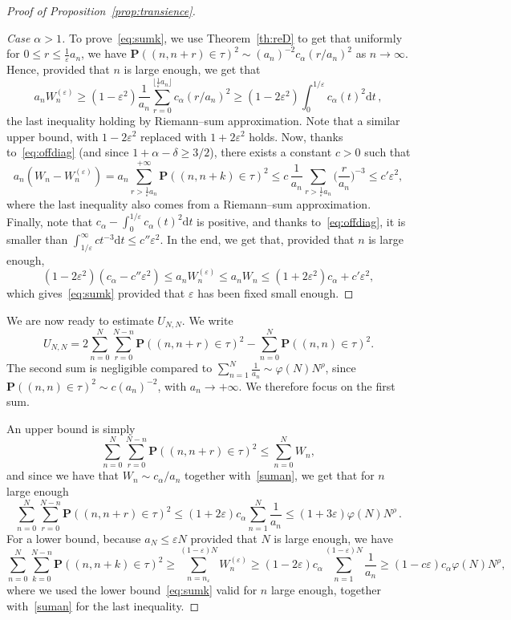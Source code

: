 \documentclass[10pt]{amsart}
\theoremstyle{definition}\newtheorem{defi}[theo]{Definition}\newtheorem{rema}[theo]{Remark}\newtheorem{exam}[theo]{Example}\newtheorem{exem}[theo]{Example}\newtheorem{nota}[theo]{Notation}
\newenvironment{step}[1]{\begin{proof}[{#1}]}{\let\qed\relax\end{proof}}
\newcommand{\ga}{\alpha}
\newcommand{\gd}{\delta}
\newcommand{\gep}{\varepsilon}
\newcommand{\dd}{\mathrm{d}}
\newcommand{\bP}{\ensuremath{\mathbf{P}}}
\newenvironment{proofc}[1][\proofname]{\begin{proof}[{#1}]}{\end{proof}}
\begin{document}
\begin{appendix}
\begin{proofc}[Proof of Proposition~\ref{prop:transience}]
\begin{step}{Case $\ga > 1$}
To prove~\eqref{eq:sumk}, we use Theorem~\ref{th:reD} to get that uniformly for $0\leq r\leq \tfrac 1\gep a_n$, we have $\bP((n,n+r) \in \tau)^2 \sim (a_n)^{-2} c_{\ga}(r/a_n)^2$ as $n\to\infty$. Hence, provided that $n$ is large enough, we get that
\[
a_n W_n^{(\gep)} \geq (1-\gep^2) \frac{1}{a_n} \sum_{r=0}^{\lfloor\frac1\gep a_n \rfloor} c_{\ga}(r/a_n)^2 \geq (1-2\gep^2) \int_{0}^{1/\gep} c_{\ga}(t)^2 \dd t\,,
\]
the last inequality holding by Riemann--sum approximation. Note that a similar upper bound, with $1-2\gep^2$ replaced with $1+2\gep^2$ holds. Now, thanks to~\eqref{eq:offdiag} (and since $1+\ga-\gd \geq 3/2$), there exists a constant $c>0$ such that
\[
a_n(W_n-W_n^{(\gep)}) = a_n \sum_{r > \frac1\gep a_n}^{+\infty} \bP((n,n+k) \in \tau)^2 \leq c\,\frac{1}{a_n} \sum_{r>\frac1\gep a_n} \Big(\frac{r}{a_n} \Big)^{-3} \leq c' \gep^2,
\]
where the last inequality also comes from a Riemann--sum approximation. Finally, note that $c_\ga -\int_{0}^{1/\gep} c_{\ga}(t)^2 \dd t $ is positive, and thanks to~\eqref{eq:offdiag}, it is smaller than $\int_{1/\gep}^{\infty} c t^{-3} \dd t \leq c'' \gep^2$. In the end, we get that, provided that $n$ is large enough,
\begin{equation}
(1-2\gep^2) (c_{\ga} - c'' \gep^2) \leq a_n W_n^{(\gep)} \leq a_n W_n \leq (1+2\gep^2) c_{\ga} + c' \gep^2,
\end{equation}
which gives~\eqref{eq:sumk} provided that $\gep$ has been fixed small enough.
\end{step}

We are now ready to estimate $U_{N,N}$. We write
\[
U_{N,N} = 2\sum_{n=0}^{N} \sum_{r=0}^{N-n} \bP((n,n+r) \in\tau)^2 - \sum_{n=0}^N \bP((n,n)\in\tau)^2.
\]
The second sum is negligible compared to $\sum_{n=1}^N \tfrac{1}{a_n}\sim \varphi(N) N^{\rho}$, since $\bP({(n,n)\in\tau})^2 \sim c (a_n)^{-2}$, with $a_n \to +\infty$. We therefore focus on the first sum.

An upper bound is simply
\[
\sum_{n=0}^N \sum_{r=0}^{N-n} \bP((n,n+r) \in\tau)^2 \leq \sum_{n=0}^N W_n,
\]
and since we have that $W_n \sim c_{\ga}/a_n$ together with~\eqref{suman}, we get that for $n$ large enough
\[
\sum_{n=0}^N \sum_{r=0}^{N-n} \bP((n,n+r) \in\tau)^2 \leq (1+2\gep) c_{\ga} \sum_{n=1}^N \frac{1}{a_n} \leq (1+3\gep) \varphi(N) N^{\rho}\,.
\]
For a lower bound, because $a_N\leq \gep N$ provided that $N$ is large enough, we have
\[
\sum_{n=0}^{N} \sum_{k=0}^{N-n} \bP((n,n+k) \in\tau)^2 \geq \sum_{n=n_{\gep}}^{(1-\gep) N} W_n^{(\gep)} \geq (1-2\gep) c_{\ga} \sum_{n=1}^{(1-\gep)N} \frac{1}{a_n} \geq (1- c\gep)c_{\ga} \varphi(N) N^{\rho},
\]
where we used the lower bound~\eqref{eq:sumk} valid for $n$ large enough, together with~\eqref{suman} for the last inequality.


\end{proofc}
\end{appendix}
\end{document}
